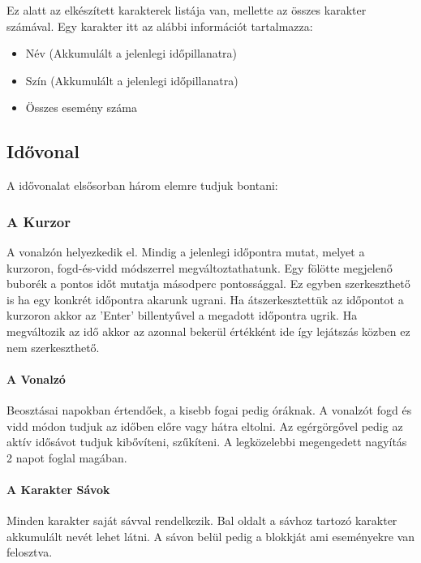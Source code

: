 Ez alatt az elkészített karakterek listája van, mellette az összes karakter számával. Egy karakter itt az alábbi információt tartalmazza:

\begin{itemize}
	\item Név (Akkumulált a jelenlegi időpillanatra)
	\item Szín (Akkumulált a jelenlegi időpillanatra)
	\item Összes esemény száma
\end{itemize}

\subsection{Idővonal} \label{section:ui-timeline}

A idővonalat elsősorban három elemre tudjuk bontani:

\subsubsection{A Kurzor}

A vonalzón helyezkedik el. Mindig a jelenlegi időpontra mutat, melyet a kurzoron, fogd-és-vidd módszerrel megváltoztathatunk. Egy fölötte megjelenő buborék a pontos időt mutatja másodperc pontossággal. Ez egyben szerkeszthető is ha egy konkrét időpontra akarunk ugrani. Ha átszerkesztettük az időpontot a kurzoron akkor az 'Enter' billentyűvel a megadott időpontra ugrik. Ha megváltozik az idő akkor az azonnal bekerül értékként ide így lejátszás közben ez nem szerkeszthető.

\paragraph{A Vonalzó}

Beosztásai napokban értendőek, a kisebb fogai pedig óráknak. A vonalzót fogd és vidd módon tudjuk az időben előre vagy hátra eltolni. Az egérgörgővel pedig az aktív idősávot tudjuk kibővíteni, szűkíteni. A legközelebbi megengedett nagyítás 2 napot foglal magában.

\paragraph{A Karakter Sávok}

Minden karakter saját sávval rendelkezik. Bal oldalt a sávhoz tartozó karakter akkumulált nevét lehet látni. A sávon belül pedig a blokkját ami eseményekre van felosztva.

